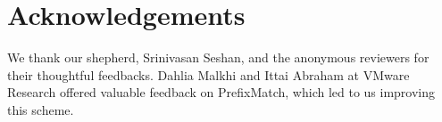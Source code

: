 
\section*{Acknowledgements}
We thank our shepherd, Srinivasan Seshan, and the anonymous reviewers for their thoughtful feedbacks. Dahlia Malkhi and Ittai Abraham at VMware Research offered valuable feedback on PrefixMatch, which led to us improving this scheme.